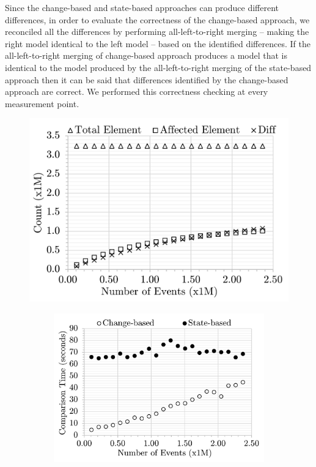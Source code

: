 \documentclass{jot}
\begin{document}
Since the change-based and state-based approaches can produce different differences, in order to evaluate the correctness of the change-based approach, we reconciled all the differences by performing all-left-to-right merging -- making the right model identical to the left model -- based on the identified differences. If the all-left-to-right merging of change-based approach produces a model that is identical to the model produced by the all-left-to-right merging of the state-based approach then it can be said that differences identified by the change-based approach are correct. We performed this correctness checking at every measurement point.

\begin{figure}
    \vspace{-26pt}
    \includegraphics[width=\linewidth]{mixed-count-events}
    \caption{total elements, affected elements, and diffs}
    \label{fig:modification_course}
    \begin{subfigure}[t]{\linewidth}
        \includegraphics[width=\linewidth]{mixed-time-events}

\end{subfigure}
\end{figure}
\end{document}
